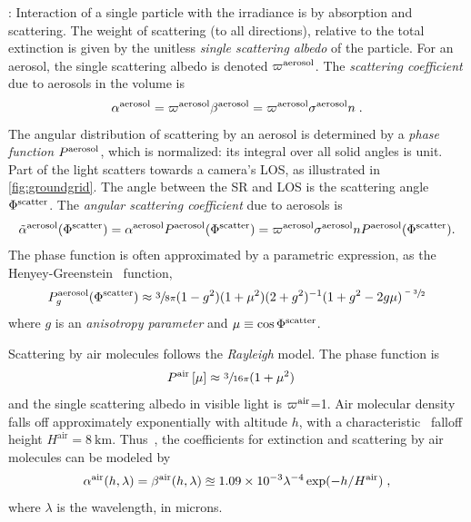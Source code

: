 \documentclass[10pt,letterpaper]{article}
\begin{document}
: Interaction of a single particle with the
irradiance is by absorption and scattering. The weight of scattering
(to all directions), relative to the total extinction is given by the
unitless {\em single scattering albedo} of the particle. For an aerosol,
the single scattering albedo is denoted $\varpi^{\rm aerosol}$.
The {\em scattering coefficient} due to aerosols in the volume is
\begin{align}
  \alpha^{\rm aerosol}= \varpi^{\rm aerosol}\beta^{\rm aerosol}
                       =\varpi^{\rm aerosol} \sigma^{\rm aerosol} n \;.
  \label{eq:alph}
\end{align}
The angular distribution of scattering by an aerosol is determined by a {\em phase function} $P^{\rm aerosol}$, which is normalized: its integral over all solid angles is unit. Part of the light scatters towards a camera's LOS, as
illustrated in \cref{fig:groundgrid}. The angle between the SR and LOS
is the scattering angle $\Phi^{\rm scatter}$. The {\em angular scattering coefficient} due to aerosols is
\begin{align}
  \tilde\alpha^{\rm aerosol}(\Phi^{\rm scatter})
  =  \alpha^{\rm aerosol} P^{\rm aerosol}(\Phi^{\rm scatter})
  = \varpi^{\rm aerosol} \sigma^{\rm aerosol} n
        P^{\rm aerosol}(\Phi^{\rm scatter}).
  \label{eq:alphabasic}
\end{align}
The phase function is often approximated by a parametric expression,
as the Henyey-Greenstein~\cite{Cornette1995} function,
\begin{align}
  P^{\rm aerosol}_g(\Phi^{\rm scatter})\approx \sfrac{3}{8\pi} (1 - g^2)(1+\mu^2)
  (2+g^2)^{-1}(1 + g^2 - 2g\mu)^{\sfrac{-3}{2}}
  \label{eq:aerosol_scatter}
\end{align}
where $g$ is an {\em anisotropy parameter} and $\mu\equiv \cos \Phi^{\rm scatter}$.


Scattering by air molecules follows the
{\em Rayleigh} model. The phase function is
\begin{align}
  P^{\rm air}\left[\mu\right] &\approx \sfrac{3}{16\pi}(1+\mu^2)
  \label{eq:rayleighP}
\end{align}
and the single scattering albedo in visible light is $\varpi^{\rm air}$=1. Air molecular density falls off approximately exponentially with altitude $h$, with a characteristic~\cite{Levi1980} falloff height $H^\mathrm{air}=8\
\si{\km}$. Thus~\cite{Levi1980}, the coefficients for
extinction and scattering by air molecules can be modeled by
\begin{align}
  \alpha^{\rm air}(h, \lambda)=\beta^{\rm air}(h, \lambda) \approxeq
  1.09 \times 10^{-3}\lambda^{-4}
  \exp(-h/H^\mathrm{air})
  \;,%
  \label{eq:rayleighbeta}
\end{align}
where $\lambda$ is the wavelength, in microns.
\end{document}
